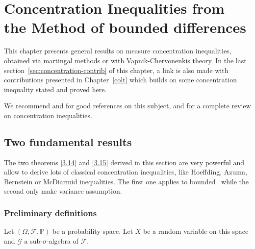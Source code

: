 \chapter{Concentration Inequalities from the Method of bounded differences}
\label{chap:back_concentration}
\begin{chapabstract}
This chapter presents general results on measure concentration inequalities, obtained via martingal methods or with Vapnik-Chervonenkis theory. In the last section~\ref{sec:concentration-contrib} of this chapter, a link is also made with contributions presented in Chapter~\ref{colt} which builds on some concentration inequality stated and proved here.
\end{chapabstract}
We recommend \cite{McDiarmid98} and \cite{Janson2002} for good references on this subject, and \cite{BLM2013} for a complete review on concentration inequalities.



\section{Two fundamental results}
The two theorems \ref{3.14} and \ref{3.15} derived in this section are very powerful and allow to derive lots of classical concentration inequalities, like
Hoeffding, Azuma, Bernstein or McDiarmid inequalities. The first one applies to bounded \rv~while the second only make variance assumption.

\subsection{Preliminary definitions}
Let $(\Omega,\mathcal{F},\mathbb{P})$ be a probability space.
Let $X$ be a random variable on this space and $\mathcal{G}$ a sub-$\sigma$-algebra of $\mathcal{F}$.

